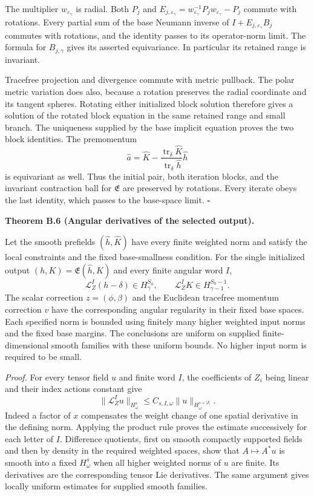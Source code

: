 \documentclass[
  english,
  11pt,
  reqno]{amsart}
\makeatletter
\newcommand{\pandocstatementheading}[1]{%
  \par\if@nobreak\else
    \addpenalty{\@beginparpenalty}%
    \addvspace{.5\baselineskip plus .2\baselineskip minus .2\baselineskip}%
  \fi
  {\normalfont\bfseries #1\par}%
  \nobreak\@afterindenttrue\@afterheading
}
\makeatother
\begin{document}
The multiplier \(w_{\varepsilon_\gamma}\) is radial. Both \(P_j\) and
\(E_{j,\varepsilon_\gamma}=w_{\varepsilon_\gamma}^{-1}P_jw_{\varepsilon_\gamma}-P_j\)
commute with rotations. Every partial sum of the base Neumann inverse of
\(I+E_{j,\varepsilon_\gamma}B_j\) commutes with rotations, and the
identity passes to its operator-norm limit. The formula for
\(B_{j,\gamma}\) gives its asserted equivariance. In particular its
retained range is invariant.

Tracefree projection and divergence commute with metric pullback. The
polar metric variation does also, because a rotation preserves the
radial coordinate and its tangent spheres. Rotating either initialized
block solution therefore gives a solution of the rotated block equation
in the same retained range and small branch. The uniqueness supplied by
the base implicit equation proves the two block identities. The
premomentum \[
\widehat a=\widehat K-
\frac{\operatorname{tr}_\delta\widehat K}
{\operatorname{tr}_\delta\widehat h}\widehat h
\] is equivariant as well. Thus the initial pair, both iteration blocks,
and the invariant contraction ball for \(\mathfrak E\) are preserved by
rotations. Every iterate obeys the last identity, which passes to the
base-space limit. \hfill\(\square\)

\pandocstatementheading{\leavevmode{}\label{thm:online-extension-all-angular-derivatives}Theorem B.6 (Angular derivatives of the selected output).}

Let the smooth prefields \((\widehat h,\widehat K)\) have every finite
weighted norm and satisfy the local constraints and the fixed
base-smallness condition. For the single initialized output
\((h,K)=\mathfrak E(\widehat h,\widehat K)\) and every finite angular
word \(I\),%
 \[
\mathcal L_Z^I(h-\delta)\in H^{S_0}_\gamma,
\qquad
\mathcal L_Z^I K\in H^{S_0-1}_{\gamma-1}.
\] The scalar correction \(z=(\phi,\beta)\) and the Euclidean tracefree
momentum correction \(v\) have the corresponding angular regularity in
their fixed base spaces. Each specified norm is bounded using finitely
many higher weighted input norms and the fixed base margins. The
conclusions are uniform on supplied finite-dimensional smooth families
with these uniform bounds. No higher input norm is required to be small.

\emph{Proof.} For every tensor field \(u\) and finite word \(I\), the
coefficients of \(Z_i\) being linear and their index actions constant
give%
 \[
\|\mathcal L_Z^Iu\|_{H^s_\omega}
\le C_{s,I,\omega}\|u\|_{H^{s+|I|}_\omega}.
\] Indeed a factor of \(x\) compensates the weight change of one spatial
derivative in the defining norm. Applying the product rule proves the
estimate successively for each letter of \(I\). Difference quotients,
first on smooth compactly supported fields and then by density in the
required weighted spaces, show that \(A\mapsto A^*u\) is smooth into a
fixed \(H^s_\omega\) when all higher weighted norms of \(u\) are finite.
Its derivatives are the corresponding tensor Lie derivatives. The same
argument gives locally uniform estimates for supplied smooth families.
\end{document}

